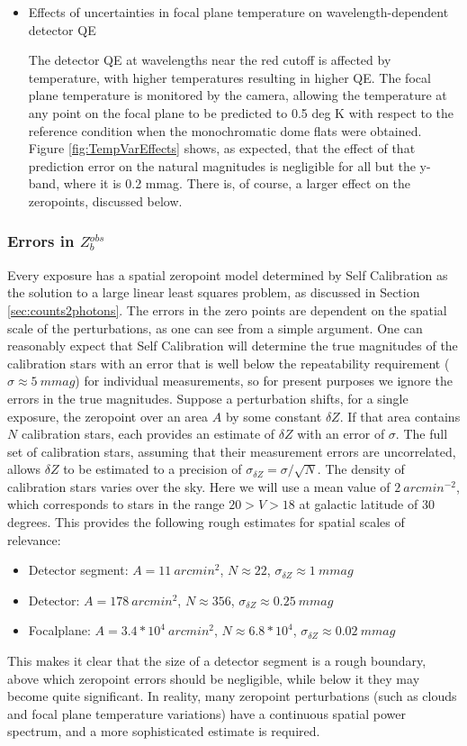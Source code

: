 \documentclass[12pt,preprint]{aastex}
\begin{document}
\begin{itemize}
\item{Effects of uncertainties in focal plane temperature on wavelength-dependent detector QE}

The detector QE at wavelengths near the red cutoff is affected by temperature, with higher temperatures resulting in higher QE.
The focal plane temperature is monitored by the camera, allowing the temperature at any point on the focal plane to be predicted to
0.5 deg K with respect to the reference condition when the monochromatic dome flats were obtained.  Figure \ref{fig:TempVarEffects}
shows, as expected, that the effect of that prediction error on the natural magnitudes is negligible for all but the y-band, where 
it is 0.2 mmag.   There is, of course, a larger effect on the zeropoints, discussed below.

\end{itemize}

\subsubsection{Errors in $Z_b^{obs}$}
\label{sec:Zb_errors}
Every exposure has a spatial zeropoint model determined by Self Calibration as the solution to a large linear least squares problem, as discussed in Section \ref{sec:counts2photons}.  The errors in the zero points are dependent on the spatial scale of the perturbations, as one can see from a simple argument.  One can reasonably expect that Self Calibration will determine the true magnitudes of the calibration stars with an error that is well below the repeatability requirement ($\sigma \approx 5~mmag$) for individual measurements, so for present purposes we ignore the errors in the true magnitudes.  Suppose a perturbation shifts, for a single exposure, the zeropoint over an area $A$ by some constant $\delta Z$.   If that area contains $N$ calibration stars, each provides an estimate of $\delta Z$ with an error of $\sigma$.   The full set of calibration stars, assuming that their measurement errors are uncorrelated, allows $\delta Z$ to be estimated to a precision of $\sigma_{\delta Z} = \sigma / \sqrt{N}$.  The density of calibration stars varies over the sky.  Here we will use a mean value of $2~arcmin^{-2}$, which corresponds to stars in the range $20 > V > 18$ at galactic latitude of 30 degrees. This provides the following rough estimates for spatial scales of relevance:
\begin{itemize}
\item{Detector segment:  $A=11~arcmin^2$, $N \approx 22$, $\sigma_{\delta Z} \approx 1~mmag$}
\item{Detector: $A=178~arcmin^2$, $N \approx 356$, $\sigma_{\delta Z} \approx 0.25~mmag$}
\item{Focalplane: $A=3.4*10^4~arcmin^2$, $N \approx 6.8*10^4$, $\sigma_{\delta Z} \approx 0.02~mmag$}
\end{itemize}
This makes it clear that the size of a detector segment is a rough boundary, above which zeropoint errors should be negligible,
while below it they may become quite significant.  In reality, many zeropoint perturbations (such as clouds and focal plane temperature variations) have a continuous spatial power spectrum, and a more sophisticated estimate is required.  
\end{document}
